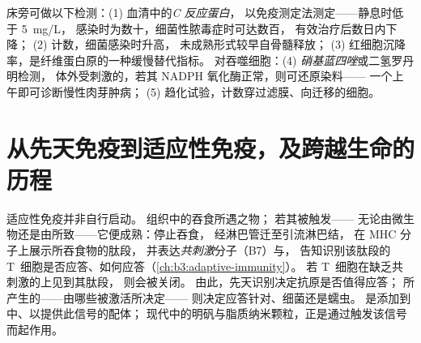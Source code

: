 \begin{method}[炎症与吞噬细胞功能的测定]\label{met:b3:innate-immunity:tests}
床旁可做以下检测：(1) 血清中的\emph{C 反应蛋白}，
以免疫测定法测定——静息时低于 \qty{5}{mg/L}，
感染时为数十，细菌性脓毒症时可达数百，
有效治疗后数日内下降；
(2) 计数，细菌感染时升高，
未成熟形式较早自骨髓释放；
(3) 红细胞沉降率，是纤维蛋白原的一种缓慢替代指标。
对吞噬细胞：(4) \emph{硝基蓝四唑}或二氢罗丹明检测，
体外受刺激的，若其 NADPH 氧化酶正常，则可还原染料——
一个上午即可诊断慢性肉芽肿病；
(5) 趋化试验，计数穿过滤膜、向迁移的细胞。
\end{method}

\section{从先天免疫到适应性免疫，及跨越生命的历程}

\begin{proposition}[树突状细胞的抉择]\label{prop:b3:innate-immunity:bridge}
适应性免疫并非自行启动。
组织中的\emph{}吞食所遇之物；
若其被触发——
无论由微生物还是由所致——它便成熟：停止吞食，
经淋巴管迁至引流淋巴结，
在 MHC 分子上展示所吞食物的肽段，
并表达\emph{共刺激}分子（B7）与，
告知识别该肽段的 T~细胞是否应答、如何应答（\cref{ch:b3:adaptive-immunity}）。
若 T~细胞在缺乏共刺激的上见到其肽段，
则会被关闭。
由此，先天识别决定抗原是否值得应答；
所产生的——由哪些被激活所决定——
则决定应答针对、细菌还是蠕虫。
\emph{}是添加到中、以提供此信号的配体；
现代中的明矾与脂质纳米颗粒，正是通过触发该信号而起作用。
\end{proposition}

